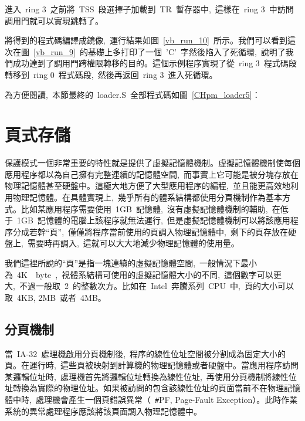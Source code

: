 進入~ring 3~之前將~TSS~段選擇子加載到~TR~暫存器中,~這樣在~ring 3~中訪問調用門就可以實現跳轉了。

\label{CHpm_tss_load}

將得到的程式碼編譯成鏡像,~運行結果如圖~\ref{vb_run_10}~所示。我們可以看到這次在圖~\ref{vb_run_9}~的基礎上多打印了一個~'C'~字然後陷入了死循環,~說明了我們成功達到了調用門跨權限轉移的目的。這個示例程序實現了從~ring 3~程式碼段轉移到~ring 0~程式碼段,~然後再返回~ring 3~進入死循環。


為方便閱讀,~本節最終的~loader.S~全部程式碼如圖~\ref{CHpm_loader5}：

\label{CHpm_loader5}

\section{頁式存儲}

保護模式一個非常重要的特性就是提供了虛擬記憶體機制。虛擬記憶體機制使每個應用程序都以為自己擁有完整連續的記憶體空間,~而事實上它可能是被分塊存放在物理記憶體甚至硬盤中。這極大地方便了大型應用程序的編程,~並且能更高效地利用物理記憶體。在具體實現上,~幾乎所有的體系結構都使用分頁機制作為基本方式。比如某應用程序需要使用~1GB~記憶體,~沒有虛擬記憶體機制的輔助,~在低于~1GB~記憶體的電腦上該程序就無法運行,~但是虛擬記憶體機制可以將該應用程序分成若幹“頁”,~僅僅將程序當前使用的頁調入物理記憶體中,~剩下的頁存放在硬盤上,~需要時再調入,~這就可以大大地減少物理記憶體的使用量。

我們這裡所說的“頁”是指一塊連續的虛擬記憶體空間,~一般情況下最小為~4K~~byte~,~視體系結構可使用的虛擬記憶體大小的不同,~這個數字可以更大,~不過一般取~2~的整數次方。比如在~Intel~奔騰系列~CPU~中,~頁的大小可以取~4KB, 2MB~或者~4MB。

\subsection{分頁機制}

當~IA-32~處理機啟用分頁機制後,~程序的線性位址空間被分割成為固定大小的頁。在運行時,~這些頁被映射到計算機的物理記憶體或者硬盤中。當應用程序訪問某邏輯位址時,~處理機首先將邏輯位址轉換為線性位址,~再使用分頁機制將線性位址轉換為實際的物理位址。如果被訪問的包含該線性位址的頁面當前不在物理記憶體中時,~處理機會產生一個頁錯誤異常（~\texttt{\#}PF, Page-Fault Exception）。此時作業系統的異常處理程序應該將該頁面調入物理記憶體中。

